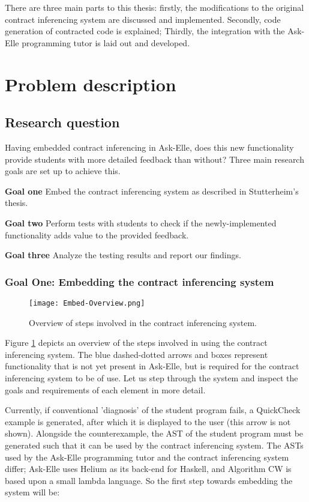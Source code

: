 \documentclass[10pt,a4paper]{article}
\begin{document}
There are three main parts to this thesis:
firstly, the modifications to the original contract inferencing system are discussed and implemented. Secondly, code generation of contracted code is explained; Thirdly, the integration with the Ask-Elle programming tutor is laid out and developed.

\section{Problem description}
\subsection{Research question}
Having embedded contract inferencing in Ask-Elle, does this new functionality provide students with more detailed feedback than without?
Three main research goals are set up to achieve this.

\begin{description}
	\item{\textbf{Goal one}} Embed the contract inferencing system as described in Stutterheim's thesis.
	\item{\textbf{Goal two}} Perform tests with students to check if the newly-implemented functionality adds value to the provided feedback.
	\item{\textbf{Goal three}} Analyze the testing results and report our findings.
\end{description}

\subsubsection{Goal One: Embedding the contract inferencing system}

\begin{figure}[h]
  \centering
    \texttt{[image: Embed-Overview.png]}
  \caption{Overview of steps involved in the contract inferencing system.}
\label{fig:EmbedOverview}
\end{figure}

Figure \ref{fig:EmbedOverview} depicts an overview of the steps involved in using the contract inferencing system.
The blue dashed-dotted arrows and boxes represent functionality that is not yet present in Ask-Elle, but is required for the contract inferencing system to be of use.
Let us step through the system and inspect the goals and requirements of each element in more detail.

Currently, if conventional 'diagnosis' of the student program fails, a QuickCheck example is generated, after which it is displayed to the user (this arrow is not shown).
Alongside the counterexample, the AST of the student program must be generated such that it can be used by the contract inferencing system.
The ASTs used by the Ask-Elle programming tutor and the contract inferencing system differ; Ask-Elle uses Helium as its back-end for Haskell, and Algorithm CW is based upon a small lambda language. So the first step towards embedding the system will be:
\end{document}

